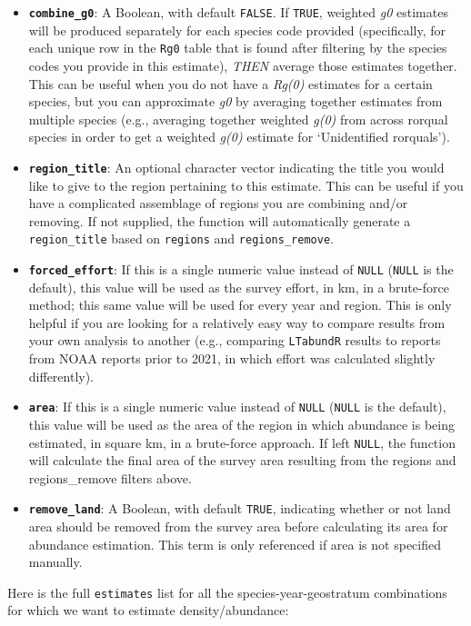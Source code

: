 \documentclass[
]{book}
\begin{document}
\begin{itemize}
\item
  \textbf{\texttt{combine\_g0}}: A Boolean, with default \texttt{FALSE}. If \texttt{TRUE}, weighted \emph{g0} estimates will be produced separately for each species code provided (specifically, for each unique row in the \texttt{Rg0} table that is found after filtering by the species codes you provide in this estimate), \emph{THEN} average those estimates together. This can be useful when you do not have a \emph{Rg(0)} estimates for a certain species, but you can approximate \emph{g0} by averaging together estimates from multiple species (e.g., averaging together weighted \emph{g(0)} from across rorqual species in order to get a weighted \emph{g(0)} estimate for `Unidentified rorquals').
\item
  \textbf{\texttt{region\_title}}: An optional character vector indicating the title you would like to give to the region pertaining to this estimate. This can be useful if you have a complicated assemblage of regions you are combining and/or removing. If not supplied, the function will automatically generate a \texttt{region\_title} based on \texttt{regions} and \texttt{regions\_remove}.
\item
  \textbf{\texttt{forced\_effort}}: If this is a single numeric value instead of \texttt{NULL} (\texttt{NULL} is the default), this value will be used as the survey effort, in km, in a brute-force method; this same value will be used for every year and region. This is only helpful if you are looking for a relatively easy way to compare results from your own analysis to another (e.g., comparing \texttt{LTabundR} results to reports from NOAA reports prior to 2021, in which effort was calculated slightly differently).
\item
  \textbf{\texttt{area}}: If this is a single numeric value instead of \texttt{NULL} (\texttt{NULL} is the default), this value will be used as the area of the region in which abundance is being estimated, in square km, in a brute-force approach. If left \texttt{NULL}, the function will calculate the final area of the survey area resulting from the regions and regions\_remove filters above.
\item
  \textbf{\texttt{remove\_land}}: A Boolean, with default \texttt{TRUE}, indicating whether or not land area should be removed from the survey area before calculating its area for abundance estimation. This term is only referenced if area is not specified manually.
\end{itemize}

Here is the full \texttt{estimates} list for all the species-year-geostratum combinations for which we want to estimate density/abundance:
\end{document}
